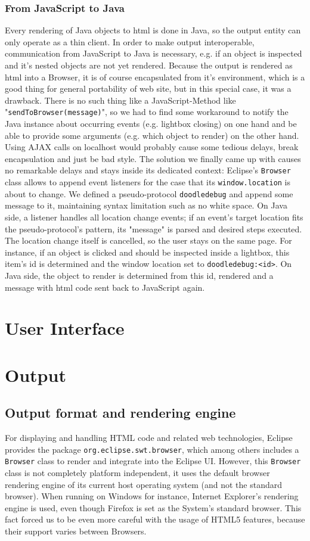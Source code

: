 \documentclass[english]{acm_proc_article-sp}
\begin{document}
\subsubsection{From JavaScript to Java}
Every rendering of Java objects to html is done in Java, so the output entity can only operate as a thin client.
In order to make output interoperable, communication from JavaScript to Java is necessary, e.g. if an object is inspected and it's nested objects are not yet rendered. Because the output is rendered as html into a Browser, it is of course encapsulated from it's environment, which is a good thing for general portability of web site, but in this special case, it was a drawback. There is no such thing like a JavaScript-Method like "\verb.sendToBrowser(message).", so we had to find some workaround to notify the Java instance about occurring events (e.g. lightbox closing) on one hand and be able to provide some arguments (e.g. which object to render) on the other hand. Using AJAX calls on localhost would probably cause some tedious delays, break encapsulation and just be bad style. The solution we finally came up with causes no remarkable delays and stays inside its dedicated context: Eclipse's \verb.Browser. class allows to append event listeners for the case that its \verb-window.location- is about to change. We defined a pseudo-protocol \verb-doodledebug- and append some message to it, maintaining syntax limitation such as no white space. On Java side, a listener handles all location change events; if an event's target location fits the pseudo-protocol's pattern, its "message" is parsed and desired steps executed. The location change itself is cancelled, so the user stays on the same page. For instance, if an object is clicked and should be inspected inside a lightbox, this item's id is determined and the window location set to \verb-doodledebug:<id>-. On Java side, the object to render is determined from this id, rendered and a message with html code sent back to JavaScript again.

\section{User Interface}
\section{Output}
\subsection{Output format and rendering engine}
For displaying and handling HTML code and related web technologies, Eclipse provides the package \verb-org.eclipse.swt.browser-, which among others includes a \verb.Browser. class to render and integrate into the Eclipse UI. However, this \verb.Browser. class is not completely platform independent, it uses the default browser rendering engine of its current host operating system (and not the standard browser). When running on Windows for instance, Internet Explorer's rendering engine is used, even though Firefox is set as the System's standard browser. This fact forced us to be even more careful with the usage of HTML5 features, because their support varies between Browsers.
\end{document}
